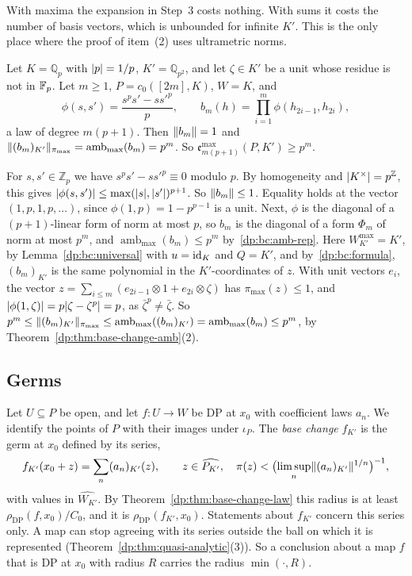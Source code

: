 With maxima the expansion in Step~3 costs nothing. With sums it costs the number of basis vectors, which is unbounded for infinite $K'$. This is the only place where the proof of item~(2) uses ultrametric norms.

\begin{example}\label{dp:ex:base-law}
Let $K=\mathbb Q_p$ with $\lvert p\rvert=1/p$, $K'=\mathbb Q_{p^2}$, and let $\zeta\in K'$ be a unit whose residue is not in $\mathbb F_p$. Let $m\ge1$, $P=c_0([2m],K)$, $W=K$, and
\[
 \phi(s,s')=\frac{s^ps'-ss'^p}p,\qquad b_m(h)=\prod_{i=1}^m\phi(h_{2i-1},h_{2i}),
\]
a law of degree $m(p+1)$. Then $\lVert b_m\rVert=1$ and $\lVert (b_m)_{K'}\rVert_{\pi_{\max}}=\operatorname{amb}_{\max}(b_m)=p^m$. So $\mathfrak e^{\max}_{m(p+1)}(P,K')\ge p^m$.

For $s,s'\in\mathbb Z_p$ we have $s^ps'-ss'^p\equiv0$ modulo $p$. By homogeneity and $\lvert K^\times\rvert=p^{\mathbb Z}$, this gives $\lvert \phi(s,s')\rvert\le\max(\lvert s\rvert,\lvert s'\rvert)^{p+1}$. So $\lVert b_m\rVert\le1$. Equality holds at the vector $(1,p,1,p,\dots)$, since $\phi(1,p)=1-p^{p-1}$ is a unit. Next, $\phi$ is the diagonal of a $(p+1)$-linear form of norm at most $p$, so $b_m$ is the diagonal of a form $\Phi_m$ of norm at most $p^m$, and $\operatorname{amb}_{\max}(b_m)\le p^m$ by~\eqref{dp:bc:amb-rep}. Here $W^{\max}_{K'}=K'$, by Lemma~\ref{dp:bc:universal} with $u=\mathrm{id}_K$ and $Q=K'$, and by~\eqref{dp:bc:formula}, $(b_m)_{K'}$ is the same polynomial in the $K'$-coordinates of $z$. With unit vectors $e_i$, the vector $z=\sum_{i\le m}(e_{2i-1}\otimes1+e_{2i}\otimes\zeta)$ has $\pi_{\max}(z)\le1$, and $\lvert \phi(1,\zeta)\rvert=p\lvert \zeta-\zeta^p\rvert=p$, as $\bar\zeta^p\ne\bar\zeta$. So $p^m\le\lVert (b_m)_{K'}\rVert_{\pi_{\max}}\le\operatorname{amb}_{\max}((b_m)_{K'})=\operatorname{amb}_{\max}(b_m)\le p^m$, by Theorem~\ref{dp:thm:base-change-amb}(2).
\end{example}

\subsection{Germs}

Let $U\subseteq P$ be open, and let $f\colon U\to W$ be DP at $x_0$ with coefficient laws $a_n$. We identify the points of $P$ with their images under $\iota_P$. The \emph{base change} $f_{K'}$ is the germ at $x_0$ defined by its series,
\[
 f_{K'}(x_0+z)=\sum_n(a_n)_{K'}(z),\qquad z\in\widehat{P_{K'}},\quad\pi(z)<\bigl(\limsup_n\lVert (a_n)_{K'}\rVert^{1/n}\bigr)^{-1},
\]
with values in $\widehat{W_{K'}}$. By Theorem~\ref{dp:thm:base-change-law} this radius is at least $\rho_{\mathrm{DP}}(f,x_0)/C_0$, and it is $\rho_{\mathrm{DP}}(f_{K'},x_0)$. Statements about $f_{K'}$ concern this series only. A map can stop agreeing with its series outside the ball on which it is represented (Theorem~\ref{dp:thm:quasi-analytic}(3)). So a conclusion about a map $f$ that is DP at $x_0$ with radius $R$ carries the radius $\min(\cdot,R)$.

